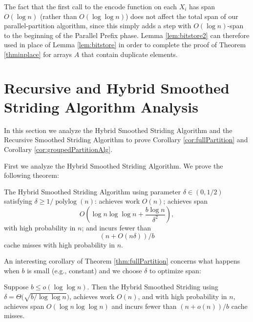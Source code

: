 \documentclass[twoside,leqno,twocolumn]{article}
\newcommand{\polylog}{\operatorname{polylog}}
\begin{document}
The fact that the first call to the encode function on each $X_i$ has
span $O(\log n)$ (rather than $O(\log \log n)$) does not affect the
total span of our parallel-partition algorithm, since this simply adds
a step with $O(\log n)$-span to the beginning of the Parallel Prefix
phase. Lemma \ref{lem:bitstore2} can therefore used in place of Lemma
\ref{lem:bitstore} in order to complete the proof of Theorem
\ref{thminplace} for arrays $A$ that contain duplicate elements.

\section{Recursive and Hybrid Smoothed Striding Algorithm Analysis}
\label{sec:hybridandrecursivethmpfs}
In this section we analyze the Hybrid Smoothed Striding Algorithm
and the Recursive Smoothed Striding Algorithm to prove Corollary
\ref{cor:fullPartition} and Corollary \ref{cor:groupedPartitionAlg}.

First we analyze the Hybrid Smoothed Striding Algorithm. We prove
the following theorem:
\begin{theorem}
  \label{thm:fullPartition} The Hybrid Smoothed Striding
  Algorithm using parameter $\delta\in(0,1/2)$ satisfying $\delta
  \ge 1/\polylog(n)$: achieves work $O(n)$; achieves span
  $$O\left(\log n \log\log n +\frac{b\log n}{\delta^2}\right),$$ with
  high probability in $n$; and incurs fewer than
  $$(n+O(n\delta))/b$$ cache misses with high probability in $n$.
\end{theorem}


An interesting corollary of Theorem \ref{thm:fullPartition}
concerns what happens when $b$ is small (e.g., constant) and we
choose $\delta$ to optimize span:

\begin{corollary}
  \label{cor:fullPartition}
Suppose $b \le o(\log \log n)$. Then the Hybrid Smoothed Striding
using $\delta = \Theta\big(\sqrt{b/\log\log n}\big)$, achieves
work $O(n)$, and with high probability in $n$, achieves span
$O(\log n \log\log n)$ and incurs fewer than $(n+o(n))/b$ cache misses.
\end{corollary}
\end{document}
